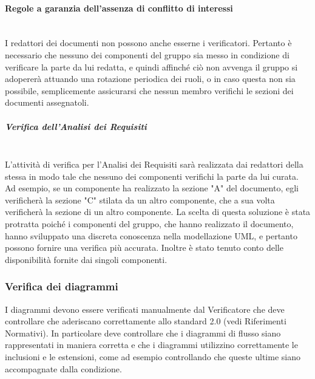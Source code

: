 \paragraph{Regole a garanzia dell'assenza di conflitto di interessi}\mbox{}\\
I redattori dei documenti non possono anche esserne i verificatori. Pertanto è necessario che nessuno dei componenti del gruppo sia messo in condizione di verificare la parte da lui redatta, e quindi affinché ciò non avvenga il gruppo si adopererà attuando una rotazione periodica dei ruoli, o in caso questa non sia possibile, semplicemente assicurarsi che nessun membro verifichi le sezioni dei documenti assegnatoli.
\subparagraph{Verifica dell'Analisi dei Requisiti}\mbox{}\\
L'attività di verifica per l'Analisi dei Requisiti sarà realizzata dai redattori della stessa in modo tale che nessuno dei componenti verifichi la parte da lui curata.
Ad esempio, se un componente ha realizzato la sezione "A" del documento, egli verificherà la sezione "C" stilata da un altro componente, che a sua volta verificherà la sezione di un altro componente. La scelta di questa soluzione è stata protratta poiché i componenti del gruppo, che hanno realizzato il documento, hanno sviluppato una discreta conoscenza nella modellazione UML, e pertanto possono fornire una verifica più accurata. Inoltre è stato tenuto conto delle disponibilità fornite dai singoli componenti. 

\subsubsection{Verifica dei diagrammi}
I diagrammi devono essere verificati manualmente dal Verificatore che deve controllare che aderiscano correttamente allo standard 2.0 (vedi Riferimenti Normativi). In particolare deve controllare che i diagrammi di flusso siano rappresentati in maniera corretta e che i diagrammi utilizzino correttamente le inclusioni e le estensioni, come ad esempio controllando che queste ultime siano accompagnate dalla condizione.